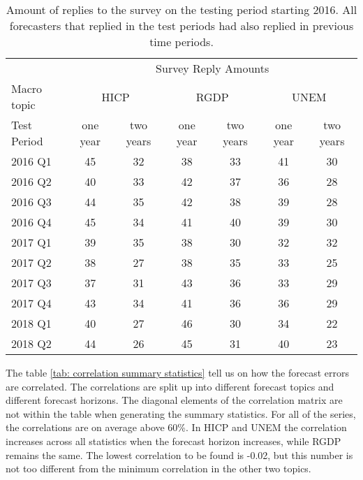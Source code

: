 \documentclass[11pt]{article}
\begin{document}
\begin{table}[!h]
	\centering
	\caption{Amount of replies to the survey on the testing period starting 2016. All forecasters that replied in the test periods had also replied in previous time periods.}
	\label{tab: amount per test period}
	\begin{tabular}{lcccccc}%
		\hline
		&\multicolumn{6}{c}{Survey Reply Amounts}\\
		\cmidrule(lr){2-7}
		Macro topic & \multicolumn{2}{c}{HICP} & \multicolumn{2}{c}{RGDP} & \multicolumn{2}{c}{UNEM} \\
		\cmidrule(lr){2-3} \cmidrule(lr){4-5}\cmidrule(lr){6-7}
		Test Period     & one year & two years & one year & two years & one year & two years \\ 
		\hline
		2016 Q1      & 45    & 32    & 38    & 33    & 41    & 30    \\
		2016 Q2      & 40    & 33    & 42    & 37    & 36    & 28    \\
		2016 Q3      & 44    & 35    & 42    & 38    & 39    & 28    \\
		2016 Q4      & 45    & 34    & 41    & 40    & 39    & 30    \\
		2017 Q1      & 39    & 35    & 38    & 30    & 32    & 32    \\
		2017 Q2      & 38    & 27    & 38    & 35    & 33    & 25    \\
		2017 Q3      & 37    & 31    & 43    & 36    & 33    & 29    \\
		2017 Q4      & 43    & 34    & 41    & 36    & 36    & 29    \\
		2018 Q1      & 40    & 27    & 46    & 30    & 34    & 22    \\
		2018 Q2      & 44    & 26    & 45    & 31    & 40    & 23    \\ 
		\hline
	\end{tabular}
\end{table}

The table \ref{tab: correlation summary statistics} tell us on how the forecast errors are correlated. The correlations are split up into different forecast topics and different forecast horizons. The diagonal elements of the correlation matrix are not within the table when generating the summary statistics. For all of the series, the correlations are on average above 60\%. In HICP and UNEM the correlation increases across all statistics when the forecast horizon increases, while RGDP remains the same. The lowest correlation to be found is -0.02, but this number is not too different from the minimum correlation in the other two topics.
\end{document}
